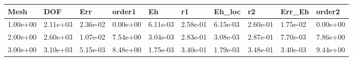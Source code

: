 \begin{tabular}{llllllllll}
Mesh & DOF & Err & order1 & Eh & r1 & Eh_loc & r2 & Err_Eh & order2 \\ 
\hline 
1.00e+00 & 2.11e+03 & 2.36e-02 & 0.00e+00 & 6.11e-03 & 2.58e-01 & 6.15e-03 & 2.60e-01 & 1.75e-02 & 0.00e+00 \\ 
2.00e+00 & 2.60e+03 & 1.07e-02 & 7.54e+00 & 3.04e-03 & 2.83e-01 & 3.08e-03 & 2.87e-01 & 7.70e-03 & 7.86e+00 \\ 
3.00e+00 & 3.10e+03 & 5.15e-03 & 8.48e+00 & 1.75e-03 & 3.40e-01 & 1.79e-03 & 3.48e-01 & 3.40e-03 & 9.44e+00 \\ 
\hline 
\end{tabular}
